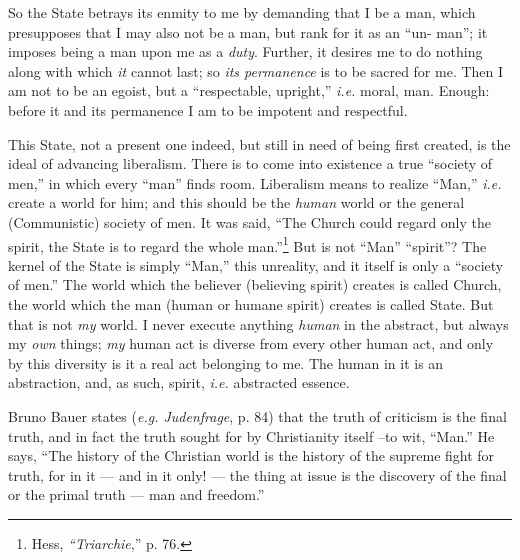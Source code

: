 So the State betrays its enmity to me by demanding that I be a man, which 
presupposes that I may also not be a man, but rank for it as an ``un- man''; 
it imposes being a man upon me as a \textit{duty}. Further, it desires me to 
do nothing along with which \textit{it} cannot last; so \textit{its 
permanence} is to be sacred for me. Then I am not to be an egoist, but a 
``respectable, upright,'' \textit{i.e.} moral, man. Enough: before it and 
its permanence I am to be impotent and respectful.

This State, not a present one indeed, but still in need of being first 
created, is the ideal of advancing liberalism. There is to come into existence 
a true ``society of men,'' in which every ``man'' finds room. Liberalism 
means to realize ``Man,'' \textit{i.e.} create a world for him; and this 
should be the \textit{human} world or the general (Communistic) society of 
men. It was said, ``The Church could regard only the spirit, the State is to 
regard the whole man.''\footnote{Hess, \textit{``Triarchie},'' p. 76.} But 
is not ``Man'' ``spirit''? The kernel of the State is simply ``Man,'' 
this unreality, and it itself is only a ``society of men.'' The world which 
the believer (believing spirit) creates is called Church, the world which the 
man (human or humane spirit) creates is called State. But that is not 
\textit{my} world. I never execute anything \textit{human} in the abstract, 
but always my \textit{own} things; \textit{my} human act is diverse from every 
other human act, and only by this diversity is it a real act belonging to me. 
The human in it is an abstraction, and, as such, spirit, \textit{i.e.} 
abstracted essence.

Bruno Bauer states (\textit{e.g. Judenfrage}, p. 84) that the truth of 
criticism is the final truth, and in fact the truth sought for by Christianity 
itself --to wit, ``Man.'' He says, ``The history of the Christian world is 
the history of the supreme fight for truth, for in it --- and in it only! --- the thing at issue is the discovery of the final or the primal truth --- man 
and freedom.''

